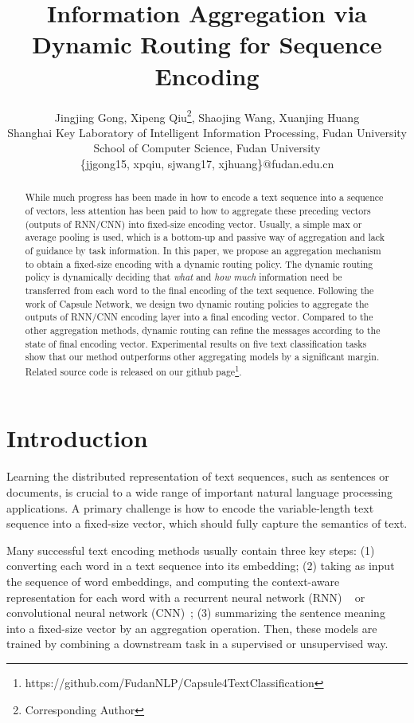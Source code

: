 \documentclass[11pt]{article}
\title{Information Aggregation  via Dynamic Routing for Sequence Encoding}
\author{Jingjing Gong, Xipeng Qiu\thanks{\hspace{1mm} Corresponding Author}, Shaojing Wang, Xuanjing Huang\\
 Shanghai Key Laboratory of Intelligent Information Processing, Fudan University\\
School of Computer Science, Fudan University\\
\{jjgong15, xpqiu, sjwang17, xjhuang\}@fudan.edu.cn\\
}
\date{}
\begin{document}
\maketitle
\begin{abstract}
While much progress has been made in how to encode a text sequence into a sequence of vectors, less attention has been paid to how to aggregate these preceding vectors (outputs of RNN/CNN) into fixed-size encoding vector. Usually, a simple max or average pooling is used, which is a bottom-up and passive way of aggregation and lack of guidance by task information.
In this paper, we propose an aggregation mechanism to obtain a fixed-size encoding with a dynamic routing policy. The dynamic routing policy is dynamically deciding that \textit{what} and \textit{how much} information need be transferred from each word to the final encoding of the text sequence. Following the work of Capsule Network, we design two dynamic routing policies to aggregate the outputs of RNN/CNN encoding layer into a final encoding vector. Compared to the other aggregation methods, dynamic routing can refine the messages according to the state of final encoding vector. Experimental results on five text classification tasks show that our method outperforms other aggregating models by a significant margin. Related source code is released on our github page\footnote{https://github.com/FudanNLP/Capsule4TextClassification}.
\end{abstract}

\section{Introduction}
\label{intro}

Learning the distributed representation of text sequences, such as sentences or documents, is crucial to a wide range of important natural language processing applications. A primary challenge is how to encode the variable-length text sequence into a fixed-size vector, which should fully capture the semantics of text.

Many successful text encoding methods usually contain three key steps: (1) converting each word in a text sequence into its embedding; (2)
taking as input the sequence of word embeddings, and computing the context-aware representation for each word with a recurrent neural network (RNN) ~\cite{hochreiter1997long,chung2014empirical} or convolutional neural network (CNN)~\cite{collobert2011natural,kim2014convolutional};
(3) summarizing the sentence meaning into a fixed-size vector by an aggregation operation.
Then, these models are trained by combining a downstream task in a supervised or unsupervised way.
\end{document}
